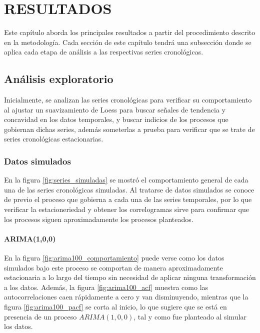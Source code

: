 \documentclass[
]{article}
\begin{document}
\newpage

\section{RESULTADOS}

Este capítulo aborda los principales resultados a partir del
procedimiento descrito en la metodología. Cada sección de este capítulo
tendrá una subsección donde se aplica cada etapa de análisis a las
respectivas series cronológicas.

\subsection{Análisis exploratorio}

Inicialmente, se analizan las series cronológicas para verificar su
comportamiento al ajustar un suavizamiento de Loess para buscar señales
de tendencia y concavidad en los datos temporales, y buscar indicios de
los procesos que gobiernan dichas series, además someterlas a prueba
para verificar que se trate de series cronológicas estacionarias.

\subsubsection{Datos simulados}

En la figura \ref{fig:series_simuladas} se mostró el comportamiento
general de cada una de las series cronológicas simuladas. Al tratarse de
datos simulados se conoce de previo el proceso que gobierna a cada una
de las series temporales, por lo que verificar la estacioneriedad y
obtener los correlogramas sirve para confirmar que los procesos siguen
aproximadamente los procesos planteados.

\paragraph{ARIMA(1,0,0)}

En la figura \ref{fig:arima100_comportamiento} puede verse como los
datos simulados bajo este proceso se comportan de manera aproximadamente
estacionaria a lo largo del tiempo sin necesidad de aplicar ninguna
transformación a los datos. Además, la figura \ref{fig:arima100_acf}
muestra como las autocorrelaciones caen rápidamente a cero y van
disminuyendo, mientras que la figura \ref{fig:arima100_pacf} se corta al
inicio, lo que sugiere que se está en presencia de un proceso
\(ARIMA(1,0,0)\), tal y como fue planteado al simular los datos.
\end{document}
